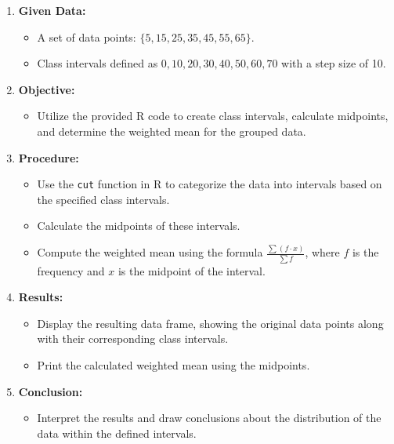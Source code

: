 \documentclass[10pt]{book}
\begin{document}
\begin{enumerate}
  \item \textbf{Given Data:}
    \begin{itemize}
      \item A set of data points: $\{5, 15, 25, 35, 45, 55, 65\}$.
      \item Class intervals defined as $0, 10, 20, 30, 40, 50, 60, 70$ with a step size of 10.
    \end{itemize}
    
  \item \textbf{Objective:}
    \begin{itemize}
      \item Utilize the provided R code to create class intervals, calculate midpoints, and determine the weighted mean for the grouped data.
    \end{itemize}
    
  \item \textbf{Procedure:}
    \begin{itemize}
      \item Use the \texttt{cut} function in R to categorize the data into intervals based on the specified class intervals.
      \item Calculate the midpoints of these intervals.
      \item Compute the weighted mean using the formula $\frac{\sum (f \cdot x)}{\sum f}$, where $f$ is the frequency and $x$ is the midpoint of the interval.
    \end{itemize}
    
  \item \textbf{Results:}
    \begin{itemize}
      \item Display the resulting data frame, showing the original data points along with their corresponding class intervals.
      \item Print the calculated weighted mean using the midpoints.
    \end{itemize}
    
  \item \textbf{Conclusion:}
    \begin{itemize}
      \item Interpret the results and draw conclusions about the distribution of the data within the defined intervals.
    \end{itemize}
\end{enumerate}
\end{document}
